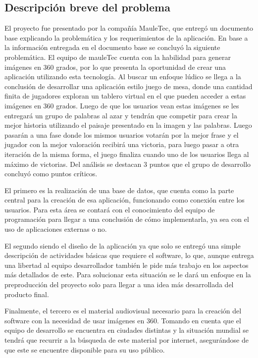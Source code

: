 \subsection{Descripción breve del problema}
El proyecto fue presentado por la compañía MauleTec, que entregó un documento base explicando la problemática y los requerimientos de la aplicación. En base a la información entregada en el documento base se concluyó la siguiente problemática. El equipo de mauleTec cuenta con la habilidad para generar imágenes en 360 grados, por lo que presenta la oportunidad de crear una aplicación utilizando esta tecnología. Al buscar un enfoque lúdico se llega a la conclusión de desarrollar una aplicación estilo juego de mesa, donde una cantidad finita de jugadores exploran un tablero virtual en el que pueden acceder a estas imágenes en 360 grados. Luego de que los usuarios vean estas imágenes se les entregará un grupo de palabras al azar y tendrán que competir para crear la mejor historia utilizando el paisaje presentado en la imagen y las palabras. Luego pasarán a una fase donde los mismos usuarios votarán por la mejor frase y el jugador con la mejor valoración recibirá una victoria, para luego pasar a otra iteración de la misma forma, el juego finaliza cuando uno de los usuarios llega al máximo de victorias. Del análisis se destacan 3 puntos que el grupo de desarrollo concluyó como puntos críticos.


El primero es la realización de una base de datos, que cuenta como la parte central para la creación de esa aplicación, funcionando como conexión entre los usuarios. Para esta área se contará con el conocimiento del equipo de programación para llegar a una conclusión de cómo implementarla, ya sea con el uso de aplicaciones externas o no.


El segundo siendo el diseño de la aplicación ya que solo se entregó una simple descripción de actividades básicas que requiere el software, lo que, aunque entrega una libertad al equipo desarrollador también le pide más trabajo en los aspectos más detallados de este. Para solucionar esta situación se le dará un enfoque en la preproducción del proyecto solo para llegar a una idea más desarrollada del producto final.


Finalmente, el tercero es el material audiovisual necesario para la creación del software con la necesidad de usar imágenes en 360. Tomando en cuenta que el equipo de desarrollo se encuentra en ciudades distintas y la situación mundial se tendrá que recurrir a la búsqueda de este material por internet, asegurándose de que este se encuentre disponible para su uso público.
